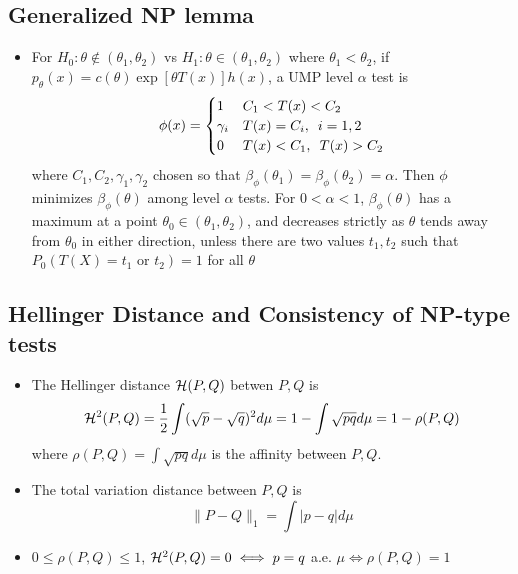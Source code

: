 \documentclass[fontsize=5pt]{scrartcl}
\begin{document}
\begin{multicols}{2}
\subsection{Generalized NP lemma}

\begin{itemize}

\item For $H_{0}:\theta\not\in(\theta_{1},\theta_{2})$ vs
  $H_{1}:\theta\in (\theta_{1},\theta_{2})$ where
  $\theta_{1}<\theta_{2}$, if $p_{\theta}(x) = c(\theta)\exp[\theta
  T(x)]h(x)$, a UMP level $\alpha$ test is
     \begin{equation}
      \phi(x) = \begin{cases}
        1 & C_{1} < T(x) < C_{2} \\
        \gamma_{i} & T(x) = C_{i},\enskip i=1,2 \\
        0 & T(x) < C_{1},\enskip T(x)>C_{2}
      \end{cases}
    \end{equation}
    where $C_{1}, C_{2}, \gamma_{1}, \gamma_{2}$ chosen so that
    $\beta_{\phi}(\theta_{1})=\beta_{\phi}(\theta_{2})=\alpha$. Then
    $\phi$ minimizes $\beta_{\phi}(\theta)$ among level $\alpha$
    tests. For $0<\alpha<1$, $\beta_{\phi}(\theta)$ has a maximum at a
    point $\theta_{0}\in(\theta_{1},\theta_{2})$, and decreases
    strictly as $\theta$ tends away from $\theta_{0}$ in either
    direction, unless there are two values $t_{1},t_{2}$ such that
    $P_{0}(T(X) = t_{1} \text{ or } t_{2})=1$ for all $\theta$
\end{itemize}

\subsection{Hellinger Distance and Consistency of NP-type tests}

\begin{itemize}
\item The Hellinger distance ${\cal H}(P,Q)$ betwen $P,Q$ is
  \begin{equation}
    {\cal H}^{2}(P,Q) = \frac{1}{2}\int (\sqrt{p}-\sqrt{q})^{2}d\mu =
    1 - \int \sqrt{pq}d\mu = 1-\rho(P,Q)
  \end{equation}
  where $\rho(P,Q)=\int\sqrt{pq}d\mu$ is the affinity between $P,Q$.
\item The total variation distance between $P,Q$ is
  \begin{equation}
    \|P-Q\|_{1}=\int |p-q|d\mu
  \end{equation}
\item $0\leq\rho(P,Q)\leq1$, ${\cal H}^{2}(P,Q)=0\iff p=q$ a.e. $\mu
  \iff \rho(P,Q)=1$


\end{itemize}
\end{multicols}
\end{document}
